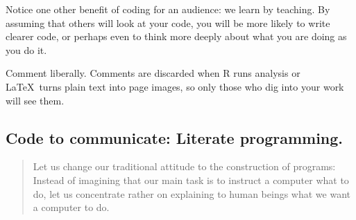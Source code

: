 \documentclass[12pt]{article}
\begin{document}

 

Notice one other benefit of coding for an audience: we learn by
teaching. By assuming that others will look at your code, you will be
more likely to write clearer code, or perhaps even to think more
deeply about what you are doing as you do it.

Comment liberally. Comments are discarded when R runs analysis or
\LaTeX~turns plain text into page images, so only those who dig into
your work will see them.

\subsection{Code to communicate: Literate programming.}

\begin{quote}
  Let us change our traditional attitude to the construction of
  programs: Instead of imagining that our main task is to instruct a
  computer what to do, let us concentrate rather on explaining to
  human beings what we want a computer to do.
  \citep[][p. 97]{knuth1984literate}
\end{quote}
\end{document}
